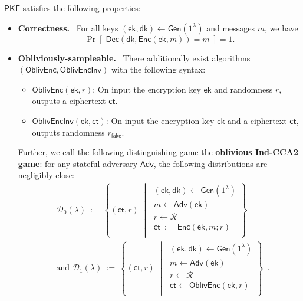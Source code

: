 \documentclass[11pt,letterpaper]{article}
\renewcommand{\emph}[1]{\textbf{#1}~}
\theoremstyle{plain} %
\theoremstyle{definition} %
\theoremstyle{remark} %
\newcommand{\eqdef}{\ {:=} \ }
\newcommand{\SecParam}{\lambda}
\newcommand{\PKE}{\mathsf{PKE}}
\newcommand{\Gen}{\mathsf{Gen}}
\newcommand{\Enc}{\mathsf{Enc}}
\newcommand{\OblivEnc}{\mathsf{OblivEnc}}
\newcommand{\OblivEncInv}{\mathsf{OblivEncInv}}
\newcommand{\Dec}{\mathsf{Dec}}
\newcommand{\EncKey}{\mathsf{ek}}
\newcommand{\DecKey}{\mathsf{dk}}
\newcommand{\Msg}{m}
\newcommand{\Ct}{\mathsf{ct}}
\newcommand{\Rand}{r}
\newcommand{\FakeRand}{r_{\mathsf{fake}}}
\newcommand{\Distribution}{\mathcal{D}}
\newcommand{\RandSpace}{\mathcal{R}}
\newcommand{\Adversary}{{\mathsf{Adv}}} %
\newcommand{\pST}{\; \middle| \;}
\begin{document}
$\PKE$ satisfies the following properties:
\begin{itemize}
    \item \emph{Correctness.} For all keys $(\EncKey, \DecKey) \gets \Gen(1^{\SecParam})$ and messages $\Msg$, we have
    \[ \Pr[\; \Dec(\DecKey, \Enc(\EncKey, \Msg)) = \Msg \;] = 1. \]

    \item \emph{Obliviously-sampleable.} There additionally exist algorithms $(\OblivEnc, \OblivEncInv)$ with the following syntax:
    \begin{itemize}
    	\item $\OblivEnc(\EncKey,\Rand)$: On input the encryption key $\EncKey$ and randomness $\Rand$, outputs a ciphertext $\Ct$.
    	\item $\OblivEncInv(\EncKey,\Ct)$: On input the encryption key $\EncKey$ and a ciphertext $\Ct$, outputs randomness $\FakeRand$.
    \end{itemize}

    Further, we call the following distinguishing game the \textbf{oblivious Ind-CCA2 game}: for any stateful adversary $\Adversary$, the following distributions are negligibly-close:
    \begin{align*}
		&\Distribution_0(\SecParam) \eqdef \left\{
		(\Ct,\Rand)
		\pST
		\begin{array}{r}
            (\EncKey,\DecKey)\gets \Gen(1^\SecParam)\\
			\Msg \gets \Adversary(\EncKey)\\
            \Rand \gets \RandSpace\\
			\Ct \eqdef \Enc(\EncKey,\Msg;\Rand)\\
		\end{array}
		\right\} \\
		&\text{and } \Distribution_1(\SecParam) \eqdef \left\{
		(\Ct, \Rand)
		\pST
		\begin{array}{r}
            (\EncKey,\DecKey)\gets \Gen(1^\SecParam)\\
            \Msg \gets \Adversary(\EncKey)\\
            \Rand \gets \RandSpace\\
            \Ct \gets \OblivEnc(\EncKey,\Rand)\\
		\end{array}
		\right\} \enspace.
	\end{align*}
\end{itemize}
\end{document}
